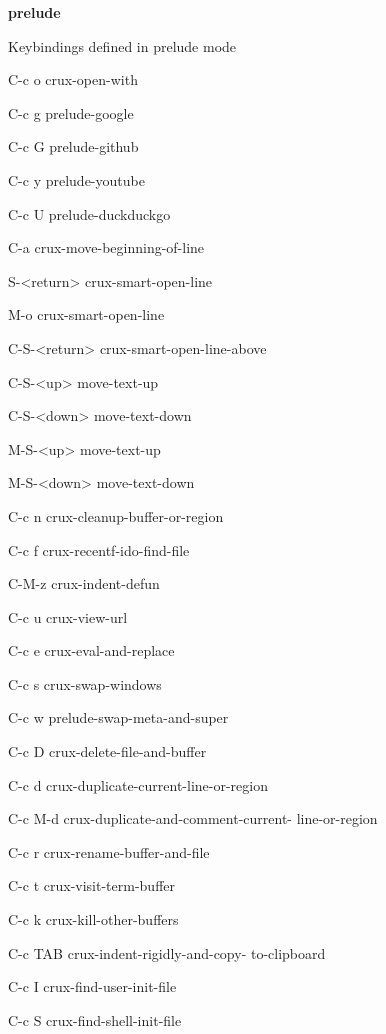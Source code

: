 \documentclass[10pt]{article}
\renewcommand\subsection[1]{\smallskip\par\textbf{\color{heading}#1}}
\newcommand\humanreadable[1]{{\par\color{default}\small\sffamily#1}}
\renewcommand\subsection[1]{\smallskip\par\textbf{\color{heading}#1}}
\newcommand\humanreadable[1]{{\par\color{orange}\small\sffamily#1}}
\begin{document}
\begin{multicols}{4}
  \subsection{prelude}

  \humanreadable{Keybindings defined in prelude mode}
  \begin{keylist}
  \item[C-c o] crux-open-with
  \item[C-c g] prelude-google
  \item[C-c G] prelude-github
  \item[C-c y] prelude-youtube
  \item[C-c U] prelude-duckduckgo
  \item[C-a] crux-move-beginning-of-line
  \item[S-<return>] crux-smart-open-line
  \item[M-o] crux-smart-open-line
  \item[C-S-<return>] crux-smart-open-line-above
  \item[C-S-<up>] move-text-up
  \item[C-S-<down>] move-text-down
  \item[M-S-<up>] move-text-up
  \item[M-S-<down>] move-text-down
  \item[C-c n] crux-cleanup-buffer-or-region
  \item[C-c f] crux-recentf-ido-find-file
  \item[C-M-z] crux-indent-defun
  \item[C-c u] crux-view-url
  \item[C-c e] crux-eval-and-replace
  \item[C-c s] crux-swap-windows
  \item[C-c w] prelude-swap-meta-and-super
  \item[C-c D] crux-delete-file-and-buffer
  \item[C-c d] crux-duplicate-current-line-or-region
  \item[C-c M-d] crux-duplicate-and-comment-current-
    line-or-region
  \item[C-c r] crux-rename-buffer-and-file
  \item[C-c t] crux-visit-term-buffer
  \item[C-c k] crux-kill-other-buffers
  \item[C-c TAB] crux-indent-rigidly-and-copy-
    to-clipboard
  \item[C-c I] crux-find-user-init-file
  \item[C-c S] crux-find-shell-init-file

\end{keylist}
\end{multicols}
\end{document}
